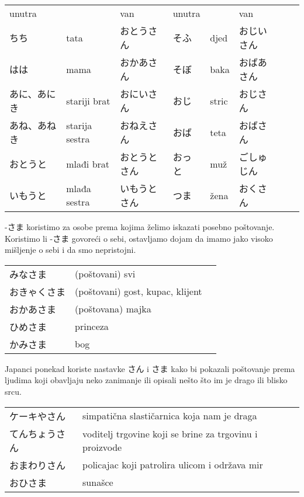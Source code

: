 	\begin{table}[!h]
	\begin{tabular}{l l l l l l l l}
		\toprule[2pt]
		unutra& &van&unutra& &van\\
		ちち&tata&おとうさん&そふ&djed&おじいさん\\
		はは&mama&おかあさん&そぼ&baka&おばあさん\\
		あに、あにき&stariji brat&おにいさん&おじ&stric&おじさん\\
		あね、あねき&starija sestra&おねえさん&おば&teta&おばさん\\
		おとうと&mlađi brat&おとうとさん&おっと&muž&ごしゅじん\\
		いもうと&mlađa sestra&いもうとさん&つま&žena&おくさん\\
		\bottomrule[2pt]
	\end{tabular}
	\end{table}
	
	-さま koristimo za osobe prema kojima želimo iskazati posebno poštovanje. Koristimo li -さま govoreći o sebi, ostavljamo dojam da imamo jako visoko mišljenje o sebi i da smo nepristojni. 

	\begin{table}[!h]
	\begin{tabular}{l l l}
		\toprule[2pt]
		みなさま&(poštovani) svi\\
		おきゃくさま&(poštovani) gost, kupac, klijent\\
		おかあさま&(poštovana) majka\\
		ひめさま&princeza\\
		かみさま&bog\\
		\bottomrule[2pt]
	\end{tabular}
	\end{table}
	\newpage	
	
	Japanci ponekad koriste nastavke さん i さま kako bi pokazali poštovanje prema ljudima koji obavljaju neko zanimanje ili opisali nešto što im je drago ili blisko srcu.
	
	\begin{table}[!h]
	\begin{tabular}{l l}
		\toprule[2pt]
		ケーキやさん&simpatična slastičarnica koja nam je draga\\
		てんちょうさん&voditelj trgovine koji se brine za trgovinu i proizvode\\
		おまわりさん&policajac koji patrolira ulicom i održava mir\\
		おひさま&sunašce\\
		\bottomrule[2pt]
	\end{tabular}
	\end{table}


